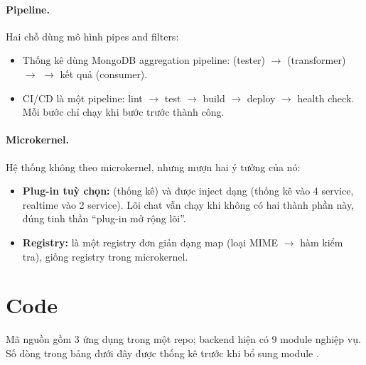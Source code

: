 \documentclass[11pt, a4paper]{article}
\begin{document}
\paragraph{Pipeline.} Hai chỗ dùng mô hình pipes and filters:
\begin{itemize}
  \item Thống kê dùng MongoDB aggregation pipeline:  (tester) $\rightarrow$  (transformer) $\rightarrow$  $\rightarrow$ kết quả (consumer).
  \item CI/CD là một pipeline: lint $\rightarrow$ test $\rightarrow$ build $\rightarrow$ deploy $\rightarrow$ health check. Mỗi bước chỉ chạy khi bước trước thành công.
\end{itemize}

\paragraph{Microkernel.} Hệ thống không theo microkernel, nhưng mượn hai ý tưởng của nó:
\begin{itemize}
  \item \textbf{Plug-in tuỳ chọn:}  (thống kê) và  được inject dạng  (thống kê vào 4 service, realtime vào 2 service). Lõi chat vẫn chạy khi không có hai thành phần này, đúng tinh thần ``plug-in mở rộng lõi''.
  \item \textbf{Registry:}  là một registry đơn giản dạng map (loại MIME $\rightarrow$ hàm kiểm tra), giống registry trong microkernel.
\end{itemize}

\section{Code}
\label{sec:code}

Mã nguồn gồm 3 ứng dụng trong một repo; backend hiện có 9 module nghiệp vụ. Số dòng trong bảng dưới đây được thống kê trước khi bổ sung module .
\end{document}
